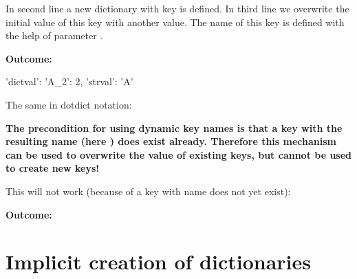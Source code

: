 In second line a new dictionary with key  is defined. In third line we overwrite the initial value of this key with another value.
The name of this key is defined with the help of parameter .

\vspace{2ex}

\textbf{Outcome:}

\begin{pythonlog}
{'dictval': {'A_2': 2}, 'strval': 'A'}
\end{pythonlog}

\vspace{2ex}

The same in dotdict notation:

\vspace{2ex}


\textbf{The precondition for using dynamic key names is that a key with the resulting name (here ) does exist already.
Therefore this mechanism can be used to overwrite the value of existing keys, but cannot be used to create new keys!}

\vspace{2ex}

This will not work (because of a key with name  does not yet exist):

\vspace{2ex}


\vspace{2ex}

\textbf{Outcome:}





\newpage

\section{Implicit creation of dictionaries}\label{implicit-creation}

